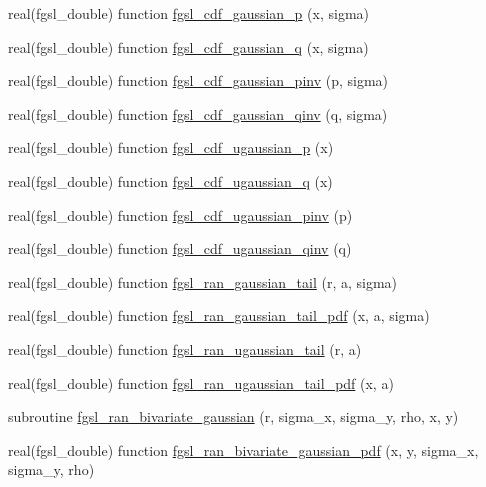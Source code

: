 \begin{DoxyCompactItemize}
\item 
real(fgsl\+\_\+double) function \hyperlink{rng_8finc_a613160a77385ab379bf3a6f5192a97a8}{fgsl\+\_\+cdf\+\_\+gaussian\+\_\+p} (x, sigma)
\item 
real(fgsl\+\_\+double) function \hyperlink{rng_8finc_a257b07452a48220b30b6b6b929637e79}{fgsl\+\_\+cdf\+\_\+gaussian\+\_\+q} (x, sigma)
\item 
real(fgsl\+\_\+double) function \hyperlink{rng_8finc_aa602d289238eeb5318d7b10562f84343}{fgsl\+\_\+cdf\+\_\+gaussian\+\_\+pinv} (p, sigma)
\item 
real(fgsl\+\_\+double) function \hyperlink{rng_8finc_a8f03982161ce0fc231bc4f7526265dc6}{fgsl\+\_\+cdf\+\_\+gaussian\+\_\+qinv} (q, sigma)
\item 
real(fgsl\+\_\+double) function \hyperlink{rng_8finc_a7f2710deecdd590d946d38f33f433e9f}{fgsl\+\_\+cdf\+\_\+ugaussian\+\_\+p} (x)
\item 
real(fgsl\+\_\+double) function \hyperlink{rng_8finc_ac8d79a3464dcf4018b294bb46be5c63c}{fgsl\+\_\+cdf\+\_\+ugaussian\+\_\+q} (x)
\item 
real(fgsl\+\_\+double) function \hyperlink{rng_8finc_a5200879f9cfb0062711be785cb73d8ba}{fgsl\+\_\+cdf\+\_\+ugaussian\+\_\+pinv} (p)
\item 
real(fgsl\+\_\+double) function \hyperlink{rng_8finc_a13c5f38d6806b5f065acab4c2f02cd72}{fgsl\+\_\+cdf\+\_\+ugaussian\+\_\+qinv} (q)
\item 
real(fgsl\+\_\+double) function \hyperlink{rng_8finc_a375409ed447b32016b5901dd7adb5146}{fgsl\+\_\+ran\+\_\+gaussian\+\_\+tail} (r, a, sigma)
\item 
real(fgsl\+\_\+double) function \hyperlink{rng_8finc_a11151be72007e872d4101d2d1fc8a3c2}{fgsl\+\_\+ran\+\_\+gaussian\+\_\+tail\+\_\+pdf} (x, a, sigma)
\item 
real(fgsl\+\_\+double) function \hyperlink{rng_8finc_a7b84620d10a8d1817b621f3a5aedf487}{fgsl\+\_\+ran\+\_\+ugaussian\+\_\+tail} (r, a)
\item 
real(fgsl\+\_\+double) function \hyperlink{rng_8finc_a54ba0fdd3a089ba1f385bf126c25564a}{fgsl\+\_\+ran\+\_\+ugaussian\+\_\+tail\+\_\+pdf} (x, a)
\item 
subroutine \hyperlink{rng_8finc_ac2fd8a36b4c4ed1ef257fc4ea9887902}{fgsl\+\_\+ran\+\_\+bivariate\+\_\+gaussian} (r, sigma\+\_\+x, sigma\+\_\+y, rho, x, y)
\item 
real(fgsl\+\_\+double) function \hyperlink{rng_8finc_ab5fb0d52054fac443429a9262a23b062}{fgsl\+\_\+ran\+\_\+bivariate\+\_\+gaussian\+\_\+pdf} (x, y, sigma\+\_\+x, sigma\+\_\+y, rho)

\end{DoxyCompactItemize}
